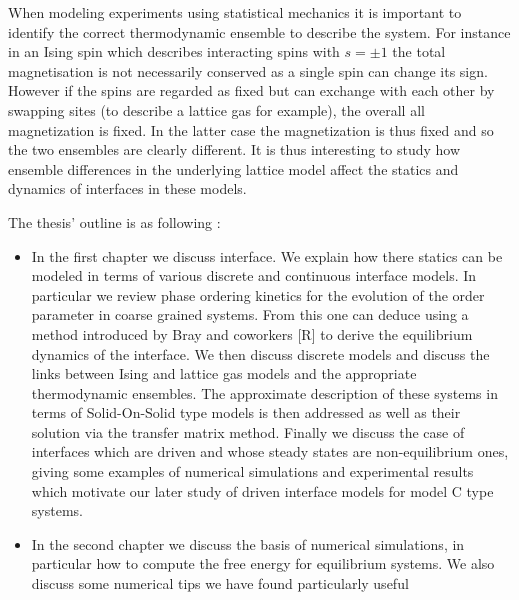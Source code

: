 When modeling experiments using statistical mechanics it is important to identify the correct thermodynamic ensemble to describe the system. For instance in an Ising spin which describes interacting spins with $s=\pm 1$ the total magnetisation is not necessarily conserved as a single spin can change its sign. However if the spins are regarded as fixed but can exchange with each other by swapping sites (to describe a lattice gas for example), the overall all magnetization is fixed. In the latter case the magnetization is thus fixed and so the two ensembles are clearly different. It is thus interesting to study how ensemble differences in the underlying lattice model affect the statics and dynamics of interfaces in these models.


The thesis' outline is as following :
\begin{itemize}
    \item In the first chapter we discuss interface. We explain how there statics can be modeled in terms of various discrete and continuous interface models. In particular we review phase ordering kinetics for the evolution of the order parameter in coarse grained systems. From this one can deduce using a method introduced by Bray and coworkers [R] to derive the equilibrium dynamics of the interface. We then discuss discrete models and discuss the links between Ising and lattice gas models and the appropriate thermodynamic ensembles. The approximate description of these systems in terms of Solid-On-Solid type models is then addressed as well as their solution via the transfer matrix method. Finally we discuss the case of interfaces which are driven and whose steady states are non-equilibrium ones, giving some examples of numerical simulations and experimental results which motivate our later study of driven interface models for model C type systems.
    \item In the second chapter we discuss the basis of numerical simulations, in particular how to compute the free energy for equilibrium systems. We also discuss some numerical tips we have found particularly useful

\end{itemize}
